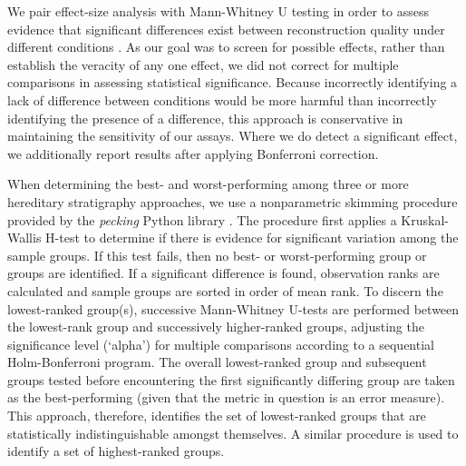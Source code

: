 We pair effect-size analysis with Mann-Whitney U testing in order to assess evidence that significant differences exist between reconstruction quality under different conditions \citep{mann1947on}.
As our goal was to screen for possible effects, rather than establish the veracity of any one effect, we did not correct for multiple comparisons in assessing statistical significance.
Because incorrectly identifying a lack of difference between conditions would be more harmful than incorrectly identifying the presence of a difference, this approach is conservative in maintaining the sensitivity of our assays.
Where we do detect a significant effect, we additionally report results after applying Bonferroni correction.

When determining the best- and worst-performing among three or more hereditary stratigraphy approaches, we use a nonparametric skimming procedure provided by the \textit{pecking} Python library \citep{moreno2024pecking}.
The procedure first applies a Kruskal-Wallis H-test to determine if there is evidence for significant variation among the sample groups.
If this test fails, then no best- or worst-performing group or groups are identified.
If a significant difference is found, observation ranks are calculated and sample groups are sorted in order of mean rank.
To discern the lowest-ranked group(s), successive Mann-Whitney U-tests are performed between the lowest-rank group and successively higher-ranked groups, adjusting the significance level (`alpha') for multiple comparisons according to a sequential Holm-Bonferroni program.
The overall lowest-ranked group and subsequent groups tested before encountering the first significantly differing group are taken as the best-performing (given that the metric in question is an error measure).
This approach, therefore, identifies the set of lowest-ranked groups that are statistically indistinguishable amongst themselves.
A similar procedure is used to identify a set of highest-ranked groups.
